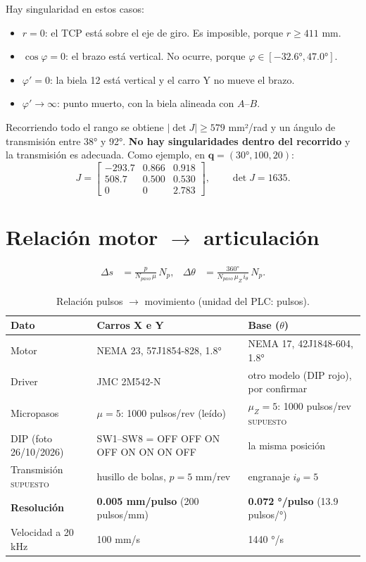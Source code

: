 \documentclass[a4paper,12pt]{article}
\newcommand{\supuesto}{\textcolor{naranja}{\textsc{supuesto}}}
\begin{document}
Hay singularidad en estos casos:
\begin{itemize}
\item $r = 0$: el TCP está sobre el eje de giro. Es imposible, porque $r \ge 411$ mm.
\item $\cos\varphi = 0$: el brazo está vertical. No ocurre, porque $\varphi \in [-32.6°, 47.0°]$.
\item $\varphi' = 0$: la biela 12 está vertical y el carro Y no mueve el brazo.
\item $\varphi' \to \infty$: punto muerto, con la biela alineada con $A$--$B$.
\end{itemize}
Recorriendo todo el rango se obtiene $|\det J| \ge 579$ mm²/rad y un ángulo de transmisión entre 38° y
92°. \textbf{No hay singularidades dentro del recorrido} y la transmisión es adecuada. Como ejemplo, en
$\mathbf{q} = (30°, 100, 20)$:
\begin{equation}
J = \begin{bmatrix} -293.7 & 0.866 & 0.918\\ 508.7 & 0.500 & 0.530\\ 0 & 0 & 2.783\end{bmatrix},
\qquad \det J = 1635 .
\end{equation}

\section{Relación motor $\rightarrow$ articulación}

\begin{align}
\Delta s &= \frac{p}{N_{paso}\,\mu}\,N_p, &
\Delta\theta &= \frac{360°}{N_{paso}\,\mu_Z\,i_\theta}\,N_p .
\end{align}

\begin{table}[H]
\centering
\begin{tabular}{@{}lll@{}}
\toprule
\textbf{Dato} & \textbf{Carros X e Y} & \textbf{Base ($\theta$)}\\
\midrule
Motor & NEMA 23, 57J1854-828, 1.8° & NEMA 17, 42J1848-604, 1.8°\\
Driver & JMC 2M542-N & otro modelo (DIP rojo), por confirmar\\
Micropasos & $\mu = 5$: 1000 pulsos/rev (leído) & $\mu_Z = 5$: 1000 pulsos/rev \supuesto\\
DIP (foto 26/10/2026) & SW1--SW8 = OFF OFF ON OFF ON ON ON OFF & la misma posición\\
Transmisión \supuesto & husillo de bolas, $p = 5$ mm/rev & engranaje $i_\theta = 5$\\
\textbf{Resolución} & \textbf{0.005 mm/pulso} (200 pulsos/mm) & \textbf{0.072 °/pulso} (13.9 pulsos/°)\\
Velocidad a 20 kHz & 100 mm/s & 1440 °/s\\
\bottomrule
\end{tabular}
\caption{Relación pulsos $\rightarrow$ movimiento (unidad del PLC: pulsos).}
\end{table}
\end{document}
